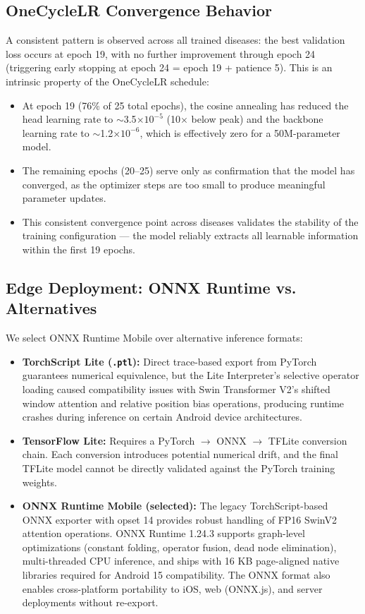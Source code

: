 \documentclass[12pt,a4paper]{report}
\begin{document}
\subsection{OneCycleLR Convergence Behavior}

A consistent pattern is observed across all trained diseases: the best validation loss occurs at epoch 19, with no further improvement through epoch 24 (triggering early stopping at epoch 24 = epoch 19 + patience 5). This is an intrinsic property of the OneCycleLR schedule:

\begin{itemize}
    \item At epoch 19 (76\% of 25 total epochs), the cosine annealing has reduced the head learning rate to $\sim$3.5$\times 10^{-5}$ (10$\times$ below peak) and the backbone learning rate to $\sim$1.2$\times 10^{-6}$, which is effectively zero for a 50M-parameter model.
    \item The remaining epochs (20--25) serve only as confirmation that the model has converged, as the optimizer steps are too small to produce meaningful parameter updates.
    \item This consistent convergence point across diseases validates the stability of the training configuration --- the model reliably extracts all learnable information within the first 19 epochs.
\end{itemize}

\subsection{Edge Deployment: ONNX Runtime vs. Alternatives}

We select ONNX Runtime Mobile over alternative inference formats:

\begin{itemize}
    \item \textbf{TorchScript Lite (\texttt{.ptl}):} Direct trace-based export from PyTorch guarantees numerical equivalence, but the Lite Interpreter's selective operator loading caused compatibility issues with Swin Transformer V2's shifted window attention and relative position bias operations, producing runtime crashes during inference on certain Android device architectures.
    
    \item \textbf{TensorFlow Lite:} Requires a PyTorch $\rightarrow$ ONNX $\rightarrow$ TFLite conversion chain. Each conversion introduces potential numerical drift, and the final TFLite model cannot be directly validated against the PyTorch training weights.
    
    \item \textbf{ONNX Runtime Mobile (selected):} The legacy TorchScript-based ONNX exporter with opset 14 provides robust handling of FP16 SwinV2 attention operations. ONNX Runtime 1.24.3 supports graph-level optimizations (constant folding, operator fusion, dead node elimination), multi-threaded CPU inference, and ships with 16 KB page-aligned native libraries required for Android 15 compatibility. The ONNX format also enables cross-platform portability to iOS, web (ONNX.js), and server deployments without re-export.
\end{itemize}
\end{document}
